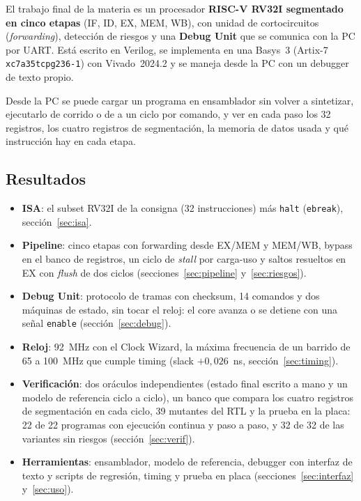 El trabajo final de la materia es un procesador \textbf{RISC-V RV32I segmentado en cinco etapas}
(IF, ID, EX, MEM, WB), con unidad de cortocircuitos (\emph{forwarding}), detección de riesgos y
una \textbf{Debug Unit} que se comunica con la PC por UART. Está escrito en Verilog, se implementa
en una Basys~3 (Artix-7 \texttt{xc7a35tcpg236-1}) con Vivado~2024.2 y se maneja desde la PC con un
debugger de texto propio.

Desde la PC se puede cargar un programa en ensamblador sin volver a sintetizar, ejecutarlo de
corrido o de a un ciclo por comando, y ver en cada paso los 32 registros, los cuatro registros de
segmentación, la memoria de datos usada y qué instrucción hay en cada etapa.

\subsection{Resultados}

\begin{itemize}[nosep]
  \item \textbf{ISA}: el subset RV32I de la consigna (32 instrucciones) más \texttt{halt}
        (\texttt{ebreak}), sección~\ref{sec:isa}.
  \item \textbf{Pipeline}: cinco etapas con forwarding desde EX/MEM y MEM/WB, bypass en el banco
        de registros, un ciclo de \emph{stall} por carga-uso y saltos resueltos en EX con
        \emph{flush} de dos ciclos (secciones~\ref{sec:pipeline} y~\ref{sec:riesgos}).
  \item \textbf{Debug Unit}: protocolo de tramas con checksum, 14 comandos y dos máquinas de
        estado, sin tocar el reloj: el core avanza o se detiene con una señal
        \texttt{enable} (sección~\ref{sec:debug}).
  \item \textbf{Reloj}: \qty{92}{\mega\hertz} con el Clock Wizard, la máxima frecuencia de un
        barrido de 65 a \qty{100}{\mega\hertz} que cumple timing (slack $+0{,}026$~ns,
        sección~\ref{sec:timing}).
  \item \textbf{Verificación}: dos oráculos independientes (estado final escrito a mano y un
        modelo de referencia ciclo a ciclo), un banco que compara los cuatro registros de
        segmentación en cada ciclo, 39 mutantes del RTL y la prueba en la placa: 22 de 22
        programas con ejecución continua y paso a paso, y 32 de 32 de las variantes sin
        riesgos (sección~\ref{sec:verif}).
  \item \textbf{Herramientas}: ensamblador, modelo de referencia, debugger con interfaz de texto y
        scripts de regresión, timing y prueba en placa (secciones~\ref{sec:interfaz}
        y~\ref{sec:uso}).
\end{itemize}

